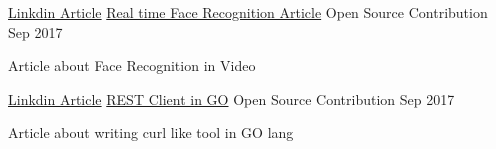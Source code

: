 

\begin{cventries}


  \cventry
    {\href{https://www.linkedin.com/pulse/real-time-face-recognition-using-facenet-ishwar-sawale/}{Linkdin Article}} %
    {\href{https://www.linkedin.com/pulse/real-time-face-recognition-using-facenet-ishwar-sawale/}{Real time Face Recognition Article}} %
    {Open Source Contribution} %
    {Sep 2017} %
    {
      \begin{cvitems} %
        \item {Article about Face Recognition in Video}
      \end{cvitems}
    }

  \cventry
    {\href{https://www.linkedin.com/pulse/writing-command-line-rest-api-client-go-lang-ishwar-sawale/}{Linkdin Article}} %
    {\href{https://www.linkedin.com/pulse/writing-command-line-rest-api-client-go-lang-ishwar-sawale/}{REST Client in GO}} %
    {Open Source Contribution} %
    {Sep 2017} %
    {
      \begin{cvitems} %
        \item {Article about writing curl like tool in GO lang}
      \end{cvitems}
    }
    

\end{cventries}
